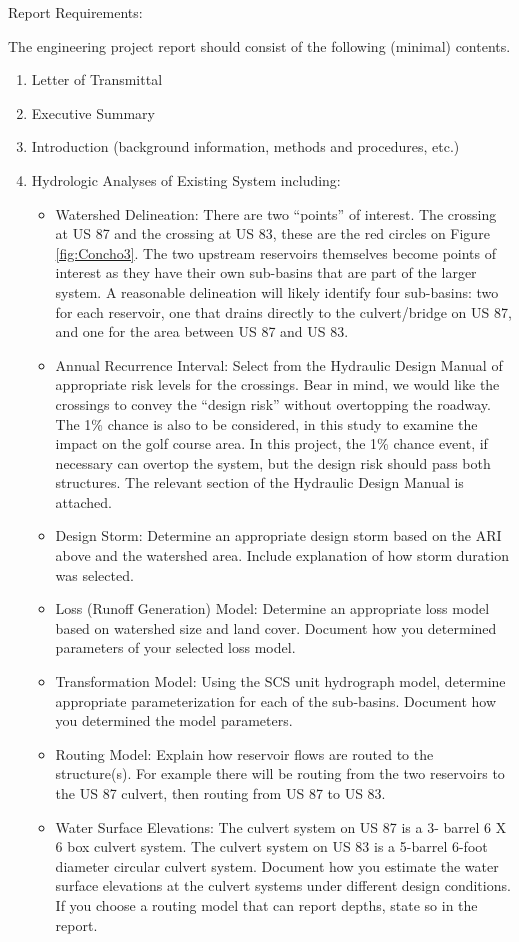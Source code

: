 \documentclass[12pt]{article}
\begin{document}
Report Requirements:

The engineering project report should consist of the following (minimal) contents.
\begin{enumerate}
\item Letter of Transmittal
\item Executive Summary
\item Introduction (background information, methods and procedures, etc.)
\item Hydrologic Analyses of Existing System including:
\begin{itemize}
\item Watershed Delineation: There are two “points” of interest. The crossing at US 87 and the crossing at US 83, these are the red circles on Figure \ref{fig:Concho3}. The two upstream reservoirs themselves become points of interest as they have their own sub-basins that are part of the larger system. A reasonable delineation will likely identify four sub-basins: two for each reservoir, one that drains directly to the culvert/bridge on US 87, and one for the area between US 87 and US 83.
\item Annual Recurrence Interval: Select from the Hydraulic Design Manual of appropriate risk levels for the crossings. Bear in mind, we would like the crossings to convey the “design risk” without overtopping the roadway. The 1\% chance is also to be considered, in this study to examine the impact on the golf course area. In this project, the 1\% chance event, if necessary can overtop the system, but the design risk should pass both structures. The relevant section of the Hydraulic Design Manual is attached.
\item Design Storm: Determine an appropriate design storm based on the ARI above and the watershed area. Include explanation of how storm duration was selected.
\item Loss (Runoff Generation) Model: Determine an appropriate loss model based on watershed size and land cover. Document how you determined parameters of your selected loss model.
\item Transformation Model: Using the SCS unit hydrograph model, determine appropriate parameterization for each of the sub-basins. Document how you determined the model parameters.
\item Routing Model: Explain how reservoir flows are routed to the structure(s). For example there will be routing from the two reservoirs to the US 87 culvert, then routing from US 87 to US 83.
\item Water Surface Elevations: The culvert system on US 87 is a 3- barrel 6 X 6 box culvert system. The culvert system on US 83 is a 5-barrel 6-foot diameter circular culvert system. Document how you estimate the water surface elevations at the culvert systems under different design conditions. If you choose a routing model that can report depths, state so in the report.

\end{itemize}
\end{enumerate}
\end{document}
